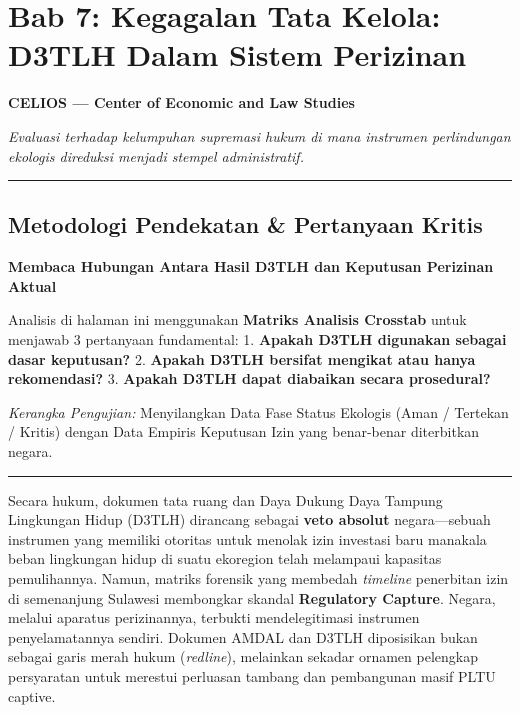 \documentclass[
]{article}
\author{}
\date{}
\begin{document}
\section{Bab 7: Kegagalan Tata Kelola: D3TLH Dalam Sistem
Perizinan}\label{bab-7-kegagalan-tata-kelola-d3tlh-dalam-sistem-perizinan}

\textbf{CELIOS --- Center of Economic and Law Studies}

\emph{Evaluasi terhadap kelumpuhan supremasi hukum di mana instrumen
perlindungan ekologis direduksi menjadi stempel administratif.}

\begin{center}\rule{0.5\linewidth}{0.5pt}\end{center}

\subsection{Metodologi Pendekatan \& Pertanyaan
Kritis}\label{metodologi-pendekatan-pertanyaan-kritis}

\textbf{Membaca Hubungan Antara Hasil D3TLH dan Keputusan Perizinan
Aktual}

Analisis di halaman ini menggunakan \textbf{Matriks Analisis Crosstab}
untuk menjawab 3 pertanyaan fundamental: 1. \textbf{Apakah D3TLH
digunakan sebagai dasar keputusan?} 2. \textbf{Apakah D3TLH bersifat
mengikat atau hanya rekomendasi?} 3. \textbf{Apakah D3TLH dapat
diabaikan secara prosedural?}

\emph{Kerangka Pengujian:} Menyilangkan Data Fase Status Ekologis (Aman
/ Tertekan / Kritis) dengan Data Empiris Keputusan Izin yang benar-benar
diterbitkan negara.

\begin{center}\rule{0.5\linewidth}{0.5pt}\end{center}

Secara hukum, dokumen tata ruang dan Daya Dukung Daya Tampung Lingkungan
Hidup (D3TLH) dirancang sebagai \textbf{veto absolut} negara---sebuah
instrumen yang memiliki otoritas untuk menolak izin investasi baru
manakala beban lingkungan hidup di suatu ekoregion telah melampaui
kapasitas pemulihannya. Namun, matriks forensik yang membedah
\emph{timeline} penerbitan izin di semenanjung Sulawesi membongkar
skandal \textbf{Regulatory Capture}. Negara, melalui aparatus
perizinannya, terbukti mendelegitimasi instrumen penyelamatannya
sendiri. Dokumen AMDAL dan D3TLH diposisikan bukan sebagai garis merah
hukum (\emph{redline}), melainkan sekadar ornamen pelengkap persyaratan
untuk merestui perluasan tambang dan pembangunan masif PLTU captive.
\end{document}
